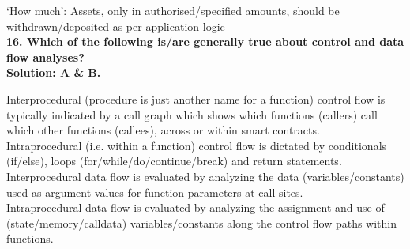 `How much': Assets, only in authorised/specified amounts, should be withdrawn/deposited as per application logic\\

\textbf{16. Which of the following is/are generally true about control and data flow analyses?}\label{sec:exam6_q16}\\

\textbf{Solution: A \& B.}

Interprocedural (procedure is just another name for a function) control flow is typically indicated by a call graph which shows which functions (callers) call which other functions (callees), across or within smart contracts.\\

Intraprocedural (i.e. within a function) control flow is dictated by conditionals (if/else), loops (for/while/do/continue/break) and return statements.\\

Interprocedural data flow is evaluated by analyzing the data (variables/constants) used as argument values for function parameters at call sites.\\

Intraprocedural data flow is evaluated by analyzing the assignment and use of (state/memory/calldata) variables/constants along the control flow paths within functions.\\